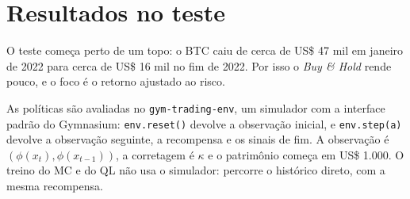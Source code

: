 \documentclass[11pt,a4paper]{article}
\begin{document}
\section{Resultados no teste}

O teste começa perto de um topo: o BTC caiu de cerca de US\$ 47 mil em janeiro de 2022 para cerca de US\$ 16 mil no fim de 2022. Por isso o \textit{Buy \& Hold} rende pouco, e o foco é o retorno ajustado ao risco.

As políticas são avaliadas no \texttt{gym-trading-env}, um simulador com a interface padrão do Gymnasium: \texttt{env.reset()} devolve a observação inicial, e \texttt{env.step(a)} devolve a observação seguinte, a recompensa e os sinais de fim. A observação é $(\phi(x_t), \phi(x_{t-1}))$, a corretagem é $\kappa$ e o patrimônio começa em US\$ 1.000. O treino do MC e do QL não usa o simulador: percorre o histórico direto, com a mesma recompensa.
\end{document}
